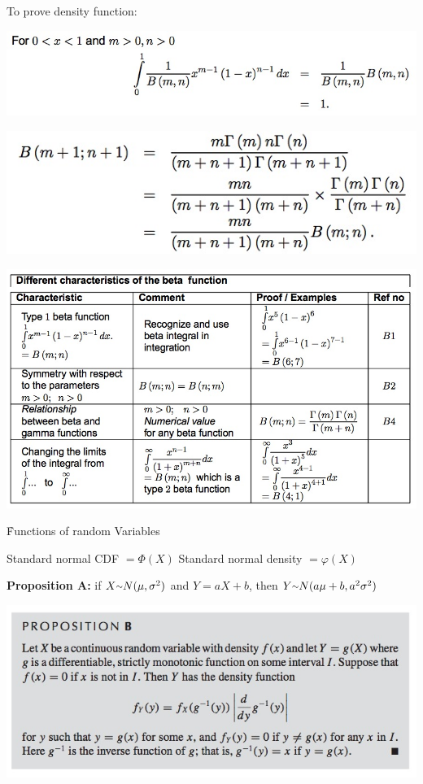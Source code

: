\documentclass{examnotes}
\begin{document}
{To prove density function:

\includegraphics[scale=0.4]{./img/2bet2.jpg}

\includegraphics[scale=0.4]{./img/2bet3.jpg}

\includegraphics[scale=0.5]{./img/2bet1.jpg}


\h{Functions of random Variables}

Standard normal CDF $= \Phi(X)$ \quad Standard normal density $= \varphi(X)$

{\bf Proposition A:}
if $X\mytilde N(\mu,\sigma^2)$ and $Y=aX+b$, then $Y\mytilde N(a\mu+b,a^2\sigma^2)$

\includegraphics[scale=0.6]{./img/2fun1.jpg}

}
\end{document}
